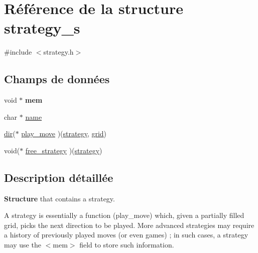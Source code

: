 \hypertarget{structstrategy__s}{
\section{Référence de la structure strategy\_\-s}
\label{structstrategy__s}
}


{\ttfamily \#include $<$strategy.h$>$}

\subsection*{Champs de données}
\begin{DoxyCompactItemize}
\item 
\hypertarget{structstrategy__s_a5f00e9b1b039412bb144bae39e66b97a}{
void $\ast$ {\bfseries mem}}
\label{structstrategy__s_a5f00e9b1b039412bb144bae39e66b97a}

\item 
char $\ast$ \hyperlink{structstrategy__s_a5ac083a645d964373f022d03df4849c8}{name}
\item 
\hyperlink{grid_8h_a862c63b15eab5b0d2781cea356e5d935}{dir}($\ast$ \hyperlink{structstrategy__s_ac4ec2cfabdd3e4b516c4164f83008809}{play\_\-move} )(\hyperlink{structstrategy__s}{strategy}, \hyperlink{structgrid__s}{grid})
\item 
void($\ast$ \hyperlink{structstrategy__s_a03f512455d12943d000c8287d130ac09}{free\_\-strategy} )(\hyperlink{structstrategy__s}{strategy})
\end{DoxyCompactItemize}


\subsection{Description détaillée}
{\bfseries Structure} that contains a strategy.

A strategy is essentially a function (play\_\-move) which, given a partially filled grid, picks the next direction to be played. More advanced strategies may require a history of previously played moves (or even games) ; in such cases, a strategy may use the $<$mem$>$ field to store such information. 

